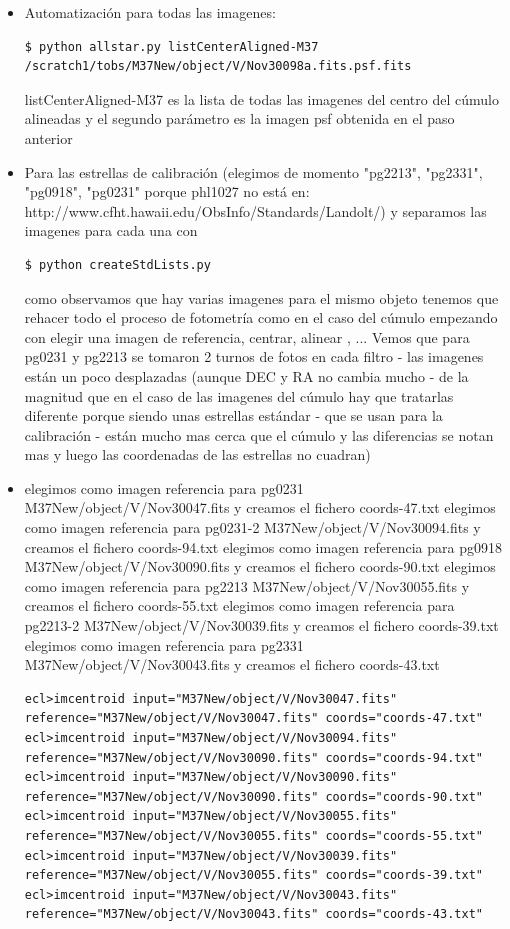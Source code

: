 \documentclass{article}
\begin{document}
\begin{itemize}
\item Automatización para todas las imagenes:
\begin{verbatim}
$ python allstar.py listCenterAligned-M37  /scratch1/tobs/M37New/object/V/Nov30098a.fits.psf.fits
\end{verbatim}
listCenterAligned-M37  es la lista de todas las imagenes del centro del cúmulo alineadas y el segundo parámetro es la imagen psf obtenida en el paso anterior

\item Para las estrellas de calibración (elegimos de momento  "pg2213", "pg2331", "pg0918", "pg0231" porque phl1027 no está en:
http://www.cfht.hawaii.edu/ObsInfo/Standards/Landolt/)
y separamos las imagenes para cada una con 

\begin{verbatim}
$ python createStdLists.py
\end{verbatim}


como observamos que hay varias imagenes para el mismo objeto tenemos que rehacer todo el proceso de fotometría como en el caso del 
cúmulo empezando con elegir una imagen de referencia, centrar, alinear , ...
Vemos que para pg0231 y pg2213 se tomaron 2 turnos de fotos en cada filtro - las imagenes están un poco desplazadas (aunque  DEC y RA no cambia mucho - de la magnitud que en el caso de las imagenes del cúmulo hay que tratarlas diferente porque siendo unas estrellas estándar - que se usan para la calibración - están mucho mas cerca que el cúmulo y las diferencias se notan mas y luego las coordenadas de las estrellas no cuadran)
\item 
elegimos como imagen referencia para pg0231  M37New/object/V/Nov30047.fits y creamos el fichero coords-47.txt
elegimos como imagen referencia para pg0231-2  M37New/object/V/Nov30094.fits y creamos el fichero coords-94.txt
elegimos como imagen referencia para pg0918  M37New/object/V/Nov30090.fits y creamos el fichero coords-90.txt
elegimos como imagen referencia para pg2213  M37New/object/V/Nov30055.fits y creamos el fichero coords-55.txt
elegimos como imagen referencia para pg2213-2  M37New/object/V/Nov30039.fits y creamos el fichero coords-39.txt
elegimos como imagen referencia para pg2331  M37New/object/V/Nov30043.fits y creamos el fichero coords-43.txt

{\tiny 
\begin{verbatim}
ecl>imcentroid input="M37New/object/V/Nov30047.fits" reference="M37New/object/V/Nov30047.fits" coords="coords-47.txt"
ecl>imcentroid input="M37New/object/V/Nov30094.fits" reference="M37New/object/V/Nov30090.fits" coords="coords-94.txt"
ecl>imcentroid input="M37New/object/V/Nov30090.fits" reference="M37New/object/V/Nov30090.fits" coords="coords-90.txt"
ecl>imcentroid input="M37New/object/V/Nov30055.fits" reference="M37New/object/V/Nov30055.fits" coords="coords-55.txt"
ecl>imcentroid input="M37New/object/V/Nov30039.fits" reference="M37New/object/V/Nov30055.fits" coords="coords-39.txt"
ecl>imcentroid input="M37New/object/V/Nov30043.fits" reference="M37New/object/V/Nov30043.fits" coords="coords-43.txt"


\end{verbatim}}
\end{itemize}
\end{document}
